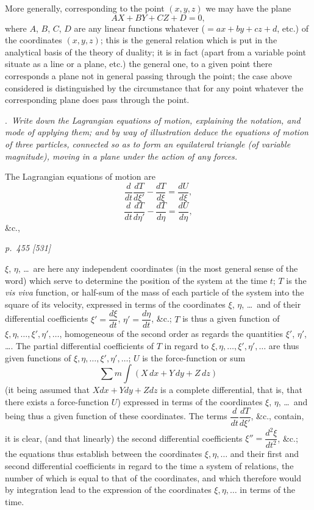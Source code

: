 \documentclass[11pt,a4paper]{article}
\theoremstyle{plain}
\theoremstyle{definition}
\begin{document}
More generally, corresponding to the point $(x, y, z)$ we may have the plane
\[
AX + BY + CZ + D = 0,
\]
where $A$, $B$, $C$, $D$ are any linear functions whatever ($= ax + by + cz + d$, etc.) of the
coordinates $(x, y, z)$; this is the general relation which is put in the analytical basis of the
theory of duality; it is in fact (apart from a variable point situate as a
line or a plane, etc.) the general one, to a given point there corresponds a
plane not in general passing through the point; the case above considered is distinguished by the circumstance that for any point whatever the corresponding plane does
pass through the point.

\medskip
{}.\ \textit{Write down the Lagrangian equations of motion, explaining the notation, and
mode of applying them; and by way of illustration deduce the equations of motion of
three particles, connected so as to form an equilateral triangle (of variable magnitude),
moving in a plane under the action of any forces.}

\medskip
The Lagrangian equations of motion are
\[
\frac{d}{dt}\frac{dT}{d\xi'}-\frac{dT}{d\xi}=\frac{dU}{d\xi},
\]
\[
\frac{d}{dt}\frac{dT}{d\eta'}-\frac{dT}{d\eta}=\frac{dU}{d\eta},
\]
\&c.,

\clearpage

\bigskip
\textit{p.~455 [531]}
\smallskip

\noindent
$\xi$, $\eta$, \ldots\ are here any independent coordinates (in the most general sense of the word)
which serve to determine the position of the system at the time $t$; $T$ is the \textit{vis viva}
function, or half-sum of the mass of each particle of the system into the square of
its velocity, expressed in terms of the coordinates $\xi$, $\eta$, \ldots\ and of their differential
coefficients $\xi'=\dfrac{d\xi}{dt}$, $\eta'=\dfrac{d\eta}{dt}$, \&c.; $T$ is thus a given function of
$\xi,\eta,\ldots,\xi',\eta',\ldots$, homogeneous of the second order as regards the
quantities $\xi'$, $\eta'$, \ldots. The partial differential coefficients of $T$ in regard to
$\xi,\eta,\ldots,\xi',\eta',\ldots$ are thus given functions of $\xi,\eta,\ldots,\xi',\eta',\ldots$;
$U$ is the force-function or sum
\[
\sum m\int(X\,dx+Y\,dy+Z\,dz)
\]
(it being assumed that $Xdx+Ydy+Zdz$ is a complete differential, that is, that there
exists a force-function $U$) expressed in terms of the coordinates $\xi$, $\eta$, \ldots\ and being
thus a given function of these coordinates. The terms $\dfrac{d}{dt}\dfrac{dT}{d\xi'}$, \&c.,
contain, it is clear, (and that linearly) the second differential coefficients
$\xi''=\dfrac{d^2\xi}{dt^2}$, \&c.; the equations thus establish between the coordinates
$\xi,\eta,\ldots$ and their first and second differential coefficients in regard to the time
a system of relations, the number of which is equal to that of the coordinates, and
which therefore would by integration lead to the expression of the coordinates
$\xi,\eta,\ldots$ in terms of the time.
\end{document}
